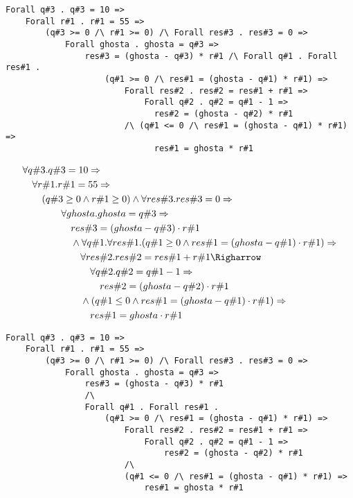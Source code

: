 
\begin{verbatim}
Forall q#3 . q#3 = 10 =>
    Forall r#1 . r#1 = 55 =>
        (q#3 >= 0 /\ r#1 >= 0) /\ Forall res#3 . res#3 = 0 =>
            Forall ghosta . ghosta = q#3 =>
                res#3 = (ghosta - q#3) * r#1 /\ Forall q#1 . Forall res#1 . 
                    (q#1 >= 0 /\ res#1 = (ghosta - q#1) * r#1) =>
                        Forall res#2 . res#2 = res#1 + r#1 =>
                            Forall q#2 . q#2 = q#1 - 1 =>
                              res#2 = (ghosta - q#2) * r#1
                        /\ (q#1 <= 0 /\ res#1 = (ghosta - q#1) * r#1) =>
                              res#1 = ghosta * r#1
\end{verbatim}

\begin{align*}
         &\forall q\#3 . q\#3 = 10 \Rightarrow \\
         &\quad \forall r\#1 . r\#1 = 55 \Rightarrow \\
         &\quad \quad (q\#3 \geq 0 \land r\#1 \geq 0) 
         							\land \forall res\#3 . res\#3 = 0 \Rightarrow \\
         &\quad \quad \quad \quad \forall ghosta . ghosta = q\#3 \Rightarrow \\
         &\quad \quad \quad \quad \quad res\#3 = (ghosta - q\#3) \cdot r\#1 \\
         &\quad \quad \quad \quad \quad \land 
           \forall q\#1 . \forall res\#1 . 
              (q\#1 \geq 0 \land res\#1 = (ghosta - q\#1) \cdot r\#1) \Rightarrow \\
         &\quad \quad \quad \quad \quad \quad
           \forall res\#2 . res\#2 = res\#1 + r\#1 \Righarrow \\
         &\quad \quad \quad \quad \quad \quad \quad
           \forall q\#2 . q\#2 = q\#1 - 1 \Rightarrow \\
         &\quad \quad \quad \quad \quad \quad \quad \quad
           res\#2 = (ghosta - q\#2) \cdot r\#1 \\
         &\quad \quad \quad \quad \quad \quad \land
           (q\#1 \leq 0 \land res\#1 = (ghosta - q\#1) \cdot r\#1) \Rightarrow \\
         &\quad \quad \quad \quad \quad \quad \quad
           res\#1 = ghosta \cdot r\#1
\end{align*}


\begin{lstlisting}
Forall q#3 . q#3 = 10 =>
    Forall r#1 . r#1 = 55 =>
        (q#3 >= 0 /\ r#1 >= 0) /\ Forall res#3 . res#3 = 0 =>
            Forall ghosta . ghosta = q#3 =>
                res#3 = (ghosta - q#3) * r#1
                /\ 
                Forall q#1 . Forall res#1 . 
                    (q#1 >= 0 /\ res#1 = (ghosta - q#1) * r#1) =>
                        Forall res#2 . res#2 = res#1 + r#1 =>
                            Forall q#2 . q#2 = q#1 - 1 =>
                                res#2 = (ghosta - q#2) * r#1
                        /\ 
                        (q#1 <= 0 /\ res#1 = (ghosta - q#1) * r#1) =>
                            res#1 = ghosta * r#1
\end{lstlisting}

